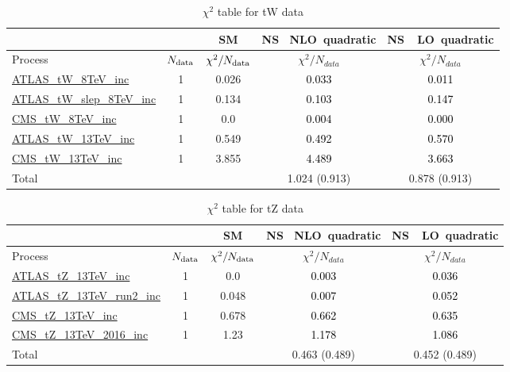 \documentclass{article}
\begin{document}
\begin{table}[H]
\centering
\begin{tabular}{|l|c|c|c|c|}
\hline
 \multicolumn{2}{|c|}{} & SM& \rm NS \ NLO\ quadratic& \rm NS\ \ LO\ quadratic\\ \hline
Process & $N_{\rm data}$ & $\chi^ 2/N_{\rm data}$& $\chi^ 2/N_{data}$& $\chi^ 2/N_{data}$\\ \hline
\href{https://arxiv.org/abs/1510.03752}{ATLAS_tW_8TeV_inc} & 1 & 0.026 & \textcolor{black}                            {0.033} & \textcolor{black}                            {0.011} \\ \hline
\href{https://arxiv.org/abs/2007.01554}{ATLAS_tW_slep_8TeV_inc} & 1 & 0.134 & \textcolor{black}                            {0.103} & \textcolor{black}                            {0.147} \\ \hline
\href{https://arxiv.org/abs/1401.2942}{CMS_tW_8TeV_inc} & 1 & 0.0 & \textcolor{black}                            {0.004} & \textcolor{black}                            {0.000} \\ \hline
\href{https://arxiv.org/abs/1612.07231}{ATLAS_tW_13TeV_inc} & 1 & 0.549 & \textcolor{black}                            {0.492} & \textcolor{black}                            {0.570} \\ \hline
\href{https://arxiv.org/abs/1805.07399}{CMS_tW_13TeV_inc} & 1 & 3.855 & \textcolor{black}                            {4.489} & \textcolor{black}                            {3.663} \\ \hline
\hline Total & &  & 1.024 (0.913) & 0.878 (0.913) \\ \hline
\end{tabular}
\caption{$\chi^2$ table for tW data}
\end{table}
\begin{table}[H]
\centering
\begin{tabular}{|l|c|c|c|c|}
\hline
 \multicolumn{2}{|c|}{} & SM& \rm NS \ NLO\ quadratic& \rm NS\ \ LO\ quadratic\\ \hline
Process & $N_{\rm data}$ & $\chi^ 2/N_{\rm data}$& $\chi^ 2/N_{data}$& $\chi^ 2/N_{data}$\\ \hline
\href{https://arxiv.org/abs/1712.02825}{ATLAS_tZ_13TeV_inc} & 1 & 0.0 & \textcolor{black}                            {0.003} & \textcolor{black}                            {0.036} \\ \hline
\href{https://arxiv.org/abs/2002.07546}{ATLAS_tZ_13TeV_run2_inc} & 1 & 0.048 & \textcolor{black}                            {0.007} & \textcolor{black}                            {0.052} \\ \hline
\href{https://arxiv.org/abs/1712.02825}{CMS_tZ_13TeV_inc} & 1 & 0.678 & \textcolor{black}                            {0.662} & \textcolor{black}                            {0.635} \\ \hline
\href{https://arxiv.org/abs/1812.05900}{CMS_tZ_13TeV_2016_inc} & 1 & 1.23 & \textcolor{black}                            {1.178} & \textcolor{black}                            {1.086} \\ \hline
\hline Total & &  & 0.463 (0.489) & 0.452 (0.489) \\ \hline
\end{tabular}
\caption{$\chi^2$ table for tZ data}
\end{table}
\end{document}
